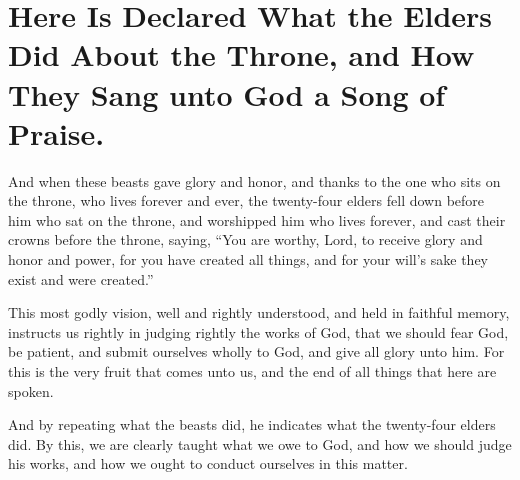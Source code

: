 \chapter[Sermon 25. Here Is Declared What the Elders Did About the Throne, and How They Sang unto God a Song of Praise.]{Here Is Declared What the Elders Did About the Throne, and How They Sang unto God a Song of Praise.}
\label{sermon:025}

And when these beasts gave glory and honor, and thanks to the one who sits on the throne, who lives forever and ever, the twenty-four elders fell down before him who sat on the throne, and worshipped him who lives forever, and cast their crowns before the throne, saying, “You are worthy, Lord, to receive glory and honor and power, for you have created all things, and for your will’s sake they exist and were created.”

This most godly vision, well and rightly understood, and held in faithful memory, instructs us rightly in judging rightly the works of God, that we should fear God, be patient, and submit ourselves wholly to God, and give all glory unto him. For this is the very fruit that comes unto us, and the end of all things that here are spoken.

And by repeating what the beasts did, he indicates what the twenty-four elders did. By this, we are clearly taught what we owe to God, and how we should judge his works, and how we ought to conduct ourselves in this matter.

